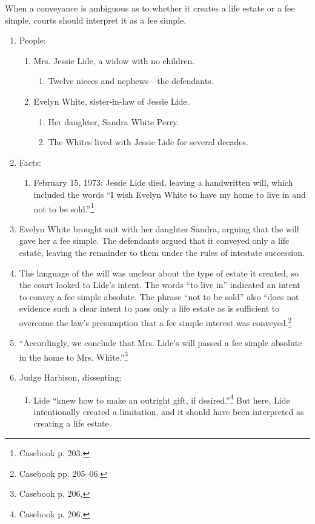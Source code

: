 When a conveyance is ambiguous as to whether it creates a life estate or a fee 
simple, courts should interpret it as a fee simple.

\begin{enumerate}
    \item People:
    \begin{enumerate}
        \item Mrs. Jessie Lide, a widow with no children.
        \begin{enumerate}
            \item Twelve nieces and nephews---the defendants.
        \end{enumerate}
        \item Evelyn White, sister-in-law of Jessie Lide.
        \begin{enumerate}
            \item Her daughter, Sandra White Perry.
            \item The Whites lived with Jessie Lide for several decades.
        \end{enumerate}
    \end{enumerate}
    \item Facts:
    \begin{enumerate}
        \item February 15, 1973: Jessie Lide died, leaving a handwritten will, 
        which included the words ``I wish Evelyn White to have my home to live 
        in and not to be sold.''\footnote{Casebook p. 203.}
    \end{enumerate}
    \item Evelyn White brought suit with her daughter Sandra, arguing that the 
    will gave her a fee simple. The defendants argued that it conveyed only a 
    life estate, leaving the remainder to them under the rules of intestate 
    succession.
    \item The language of the will was unclear about the type of estate it 
    created, so the court looked to Lide's intent. The words ``to live in'' 
    indicated an intent to convey a fee simple absolute. The phrase ``not to 
    be sold'' also ``does not evidence such a clear intent to pass only a life 
    estate as is sufficient to overcome the law's presumption that a fee 
    simple interest was conveyed.\footnote{Casebook pp. 205--06.}
    \item ``Accordingly, we conclude that Mrs. Lide's will passed a fee 
    simple absolute in the home to Mrs. White.''\footnote{Casebook p. 206.}
    \item Judge Harbison, dissenting:
    \begin{enumerate}
        \item Lide ``knew how to make an outright gift, if 
        desired.''\footnote{Casebook p. 206.} But here, Lide intentionally 
        created a limitation, and it should have been interpreted as creating 
        a life estate.
    \end{enumerate}
\end{enumerate}

